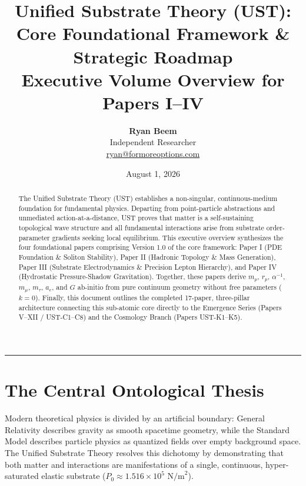 \documentclass[11pt,a4paper]{article}
\title{\Large\bfseries Unified Substrate Theory (UST):\\Core Foundational Framework \& Strategic Roadmap\\[0.3em]
	\large Executive Volume Overview for Papers I--IV}
\author{
	\textbf{Ryan Beem}\\[0.5em]
	\small Independent Researcher \\
	\small \href{mailto:ryan@formoreoptions.com}{ryan@formoreoptions.com}
}
\date{August 1, 2026}
\begin{document}
	
	\maketitle
	
	\begin{abstract}
		The Unified Substrate Theory (UST) establishes a non-singular, continuous-medium foundation for fundamental physics. Departing from point-particle abstractions and unmediated action-at-a-distance, UST proves that matter is a self-sustaining topological wave structure and all fundamental interactions arise from substrate order-parameter gradients seeking local equilibrium. This executive overview synthesizes the four foundational papers comprising Version 1.0 of the core framework: Paper I (PDE Foundation \& Soliton Stability), Paper II (Hadronic Topology \& Mass Generation), Paper III (Substrate Electrodynamics \& Precision Lepton Hierarchy), and Paper IV (Hydrostatic Pressure-Shadow Gravitation). Together, these papers derive $m_p$, $r_p$, $\alpha^{-1}$, $m_\mu$, $m_\tau$, $a_e$, and $G$ ab-initio from pure continuum geometry without free parameters ($k=0$). Finally, this document outlines the completed 17-paper, three-pillar architecture connecting this sub-atomic core directly to the Emergence Series (Papers V--XII / UST-C1--C8) and the Cosmology Branch (Papers UST-K1--K5).
	\end{abstract}
	
	\vspace{1em}
	\hrule
	\vspace{1.5em}
	
	\section{The Central Ontological Thesis}
	\label{sec:thesis}
	
	Modern theoretical physics is divided by an artificial boundary: General Relativity describes gravity as smooth spacetime geometry, while the Standard Model describes particle physics as quantized fields over empty background space. The Unified Substrate Theory resolves this dichotomy by demonstrating that both matter and interactions are manifestations of a single, continuous, hyper-saturated elastic substrate ($P_0 \approx 1.516 \times 10^5 \text{ N/m}^2$).
	
\end{document}
